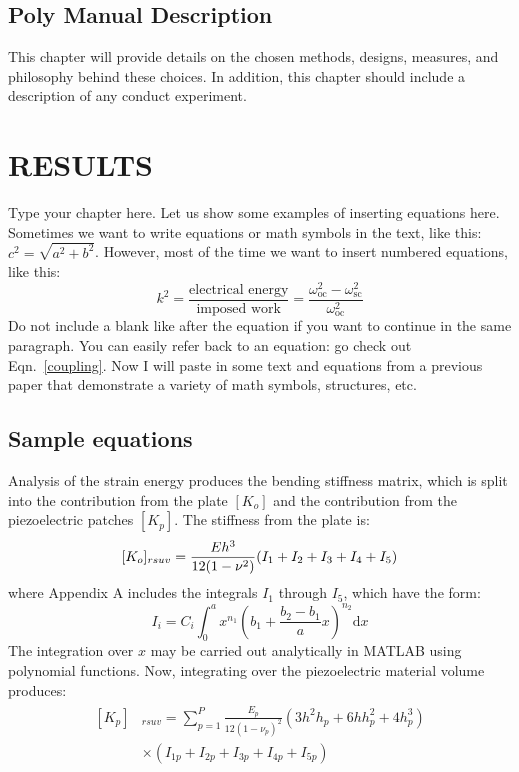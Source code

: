 \documentclass{article}
\begin{document}
\begin{body}
\section{Poly Manual Description}
This chapter will provide details on the chosen methods, designs, measures, and philosophy behind these choices. In addition, this chapter should include a description of any conduct experiment.







\chapter{RESULTS}
Type your chapter here. Let us show some examples of inserting equations here. Sometimes we want to write equations or math symbols in the text, like this: $c^2=\sqrt{a^2+b^2}$. However, most of the time we want to insert numbered equations, like this:
\begin{equation}\label{coupling}
k^2=\frac{\text{electrical energy}}{\text{imposed work}}=\frac{\omega^2_{\text{oc}}-\omega^2_{\text{sc}}}{\omega^2_{\text{oc}}}
\end{equation}
Do not include a blank like after the equation if you want to continue in the same paragraph. You can easily refer back to an equation: go check out Eqn.~\eqref{coupling}. Now I will paste in some text and equations from a previous paper that demonstrate a variety of math symbols, structures, etc. 


\section{Sample equations}
Analysis of the strain energy produces the bending stiffness matrix, which is split into the contribution from the plate $[K_o]$ and the contribution from the piezoelectric patches $[K_p]$. The stiffness from the plate is:
\begin{equation}\label{Stiffness}
[K_o]_{rsuv}=\frac{Eh^3}{12(1-\nu^2)}(I_1+I_2+I_3+I_4+I_5) \\
\end{equation}
where Appendix A includes the integrals $I_1$ through $I_5$, which have the form:
\begin{equation}
I_i=C_i\int_0^a x^{n_1}(b_1+\frac{b_2-b_1}{a}x)^{n_2} \text{d}x
\end{equation}
The integration over $x$ may be carried out analytically in MATLAB using polynomial functions. Now, integrating over the piezoelectric material volume produces:
\begin{align}\label{PiezoStiffness}
\begin{split}
[K_p]&_{rsuv}=\sum_{p=1}^P \frac{E_p}{12(1-\nu_p)^2} (3h^2 h_p+6h h_p^2+4h_p^3) \\
&\times (I_{1p}+I_{2p}+I_{3p}+I_{4p}+I_{5p})
\end{split}
\end{align}


\end{body}
\end{document}
